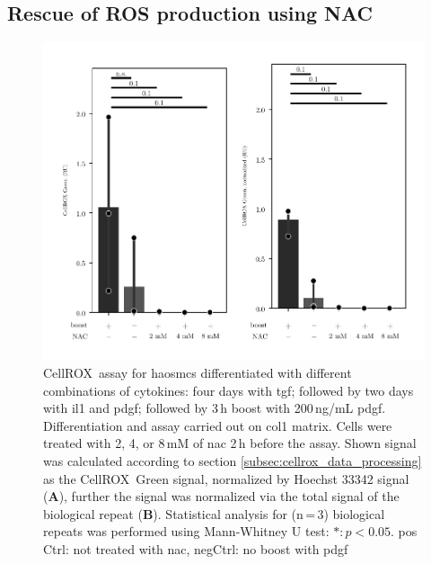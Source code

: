     \subsection{Rescue of ROS production using NAC}
        \begin{figure}[h!]
    \capstart
        \centering
    	\includegraphics{Abbildung/NAC_quench.pdf}

    	\begin{minipage}{\captionwidth}
    		\caption[NAC quench]{ \newline
            CellROX\texttrademark~assay for \acp{haosmc} differentiated with different combinations of cytokines: four days with \ac{tgf}; followed by two days with \ac{il1} and \ac{pdgf}; followed by 3\,h boost with 200\,ng/mL \ac{pdgf}. Differentiation and assay carried out on \ac{col1} matrix. Cells were treated with 2, 4, or 8\,mM of \ac{nac} 2\,h before the assay.
            Shown signal was calculated according to section \ref{subsec:cellrox_data_processing} as the CellROX\texttrademark~Green signal, normalized by Hoechst 33342 signal (\textbf{A}), further the signal was normalized via the total signal of the biological repeat (\textbf{B}). Statistical analysis for (n\,=\,3) biological repeats was performed using Mann-Whitney U test: $*: p < 0.05$.
            pos Ctrl: not treated with \ac{nac}, negCtrl: no boost with \ac{pdgf}}
    		\label{fig:NAC_quench}
    	\end{minipage}
    \end{figure}

